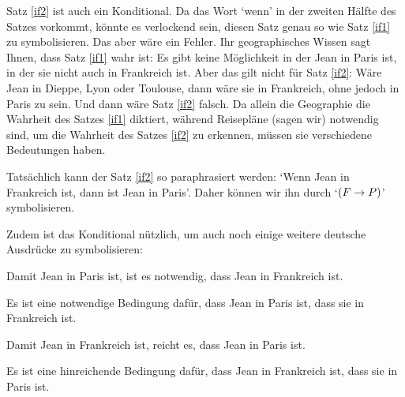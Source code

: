 



Satz \ref{if2} ist auch ein Konditional. Da das Wort `wenn' in der zweiten Hälfte des Satzes vorkommt, könnte es verlockend sein, diesen Satz genau so wie Satz \ref{if1} zu symbolisieren. Das aber wäre ein Fehler. Ihr geographisches Wissen sagt Ihnen, dass Satz \ref{if1} wahr ist: Es gibt keine Möglichkeit in der Jean in Paris ist, in der sie nicht auch in Frankreich ist. Aber das gilt nicht für Satz \ref{if2}: Wäre Jean in Dieppe, Lyon oder Toulouse, dann wäre sie in Frankreich, ohne jedoch in Paris zu sein. Und dann wäre Satz \ref{if2} falsch. Da allein die Geographie die Wahrheit des Satzes \ref{if1} diktiert, während Reisepläne (sagen wir) notwendig sind, um die Wahrheit des Satzes \ref{if2} zu erkennen, müssen sie verschiedene Bedeutungen haben.

Tatsächlich kann der Satz \ref{if2} so paraphrasiert werden: `Wenn Jean in Frankreich ist, dann ist Jean in Paris'. Daher können wir ihn durch `$(F \rightarrow P)$' symbolisieren.

Zudem ist das Konditional nützlich, um auch noch einige weitere deutsche Ausdrücke zu symbolisieren: 
\begin{earg}
		\item[\ex{ifnec1}] Damit Jean in Paris ist, ist es notwendig, dass Jean in Frankreich ist.
		\item[\ex{ifnec2}] Es ist eine notwendige Bedingung dafür, dass Jean in Paris ist, dass sie in Frankreich ist.
		\item[\ex{ifsuf1}] Damit Jean in Frankreich ist, reicht es, dass Jean in Paris ist.
		\item[\ex{ifsuf2}] Es ist eine hinreichende Bedingung dafür, dass Jean in Frankreich ist, dass sie in Paris ist.
\end{earg}

